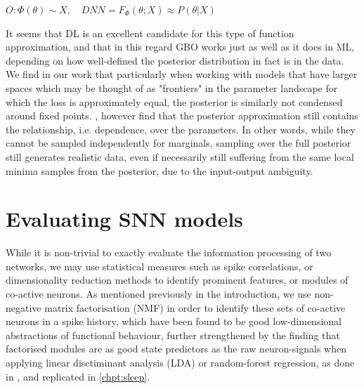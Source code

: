 \documentclass[mphil,deptreport,ianc]{infthesis} %
\begin{document}
\begin{math}
    O: \Phi(\theta) \sim X, \quad
    DNN = F_\Phi(\theta; X) \approx P(\theta|X)
\end{math}

It seems that DL is an excellent candidate for this type of function approximation, and that in this regard GBO works just as well as it does in ML, depending on how well-defined the posterior distribution in fact is in the data.
We find in our work that particularly when working with models that have larger spaces which may be thought of as "frontiers" in the parameter landscape for which the loss is approximately equal, the posterior is similarly not condensed around fixed points.
\cite{Lueckmann2021}, however find that the posterior approximation still contains the relationship, i.e. dependence, over the parameters. %
In other words, while they cannot be sampled independently for marginals, sampling over the full posterior still generates realistic data, even if necessarily still suffering from the same local minima samples from the posterior, due to the input-output ambiguity.


\section{Evaluating SNN models}


While it is non-trivial to exactly evaluate the information processing of two networks, we may use statistical measures such as spike correlations, or dimensionality reduction methods to identify prominent features, or modules of co-active neurons.
As mentioned previously in the introduction, we use non-negative matrix factorisation (NMF) \cite{Seung1999, Seung2001} in order to identify these sets of co-active neurons in a spike history, which have been found to be good low-dimensional abstractions of functional behaviour, further strengthened by the finding that factorised modules are as good state predictors as the raw neuron-signals when applying linear disctiminant analysis (LDA) or random-forest regression, as done in \cite{Onken2016a}, and replicated in \ref{chpt:sleep}.
\end{document}

